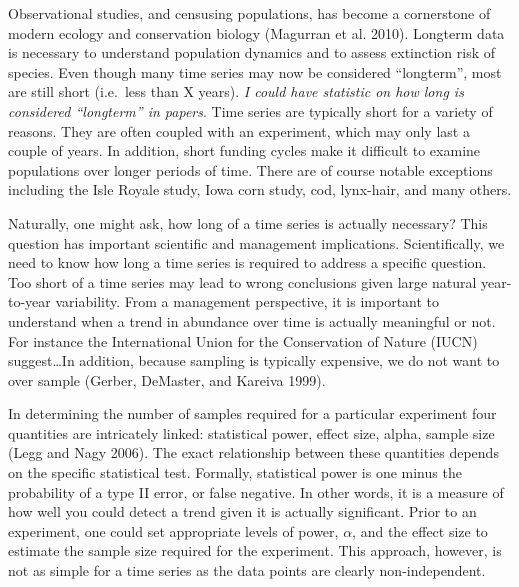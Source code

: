 \documentclass[11pt,]{article}
\begin{document}
Observational studies, and censusing populations, has become a
cornerstone of modern ecology and conservation biology (Magurran et al.
2010). Longterm data is necessary to understand population dynamics and
to assess extinction risk of species. Even though many time series may
now be considered ``longterm'', most are still short (i.e.~less than X
years). \emph{I could have statistic on how long is considered
``longterm'' in papers}. Time series are typically short for a variety
of reasons. They are often coupled with an experiment, which may only
last a couple of years. In addition, short funding cycles make it
difficult to examine populations over longer periods of time. There are
of course notable exceptions including the Isle Royale study, Iowa corn
study, cod, lynx-hair, and many others.

Naturally, one might ask, how long of a time series is actually
necessary? This question has important scientific and management
implications. Scientifically, we need to know how long a time series is
required to address a specific question. Too short of a time series may
lead to wrong conclusions given large natural year-to-year variability.
From a management perspective, it is important to understand when a
trend in abundance over time is actually meaningful or not. For instance
the International Union for the Conservation of Nature (IUCN)
suggest\ldots{}In addition, because sampling is typically expensive, we
do not want to over sample (Gerber, DeMaster, and Kareiva 1999).

In determining the number of samples required for a particular
experiment four quantities are intricately linked: statistical power,
effect size, alpha, sample size (Legg and Nagy 2006). The exact
relationship between these quantities depends on the specific
statistical test. Formally, statistical power is one minus the
probability of a type II error, or false negative. In other words, it is
a measure of how well you could detect a trend given it is actually
significant. Prior to an experiment, one could set appropriate levels of
power, \(\alpha\), and the effect size to estimate the sample size
required for the experiment. This approach, however, is not as simple
for a time series as the data points are clearly non-independent.
\end{document}
